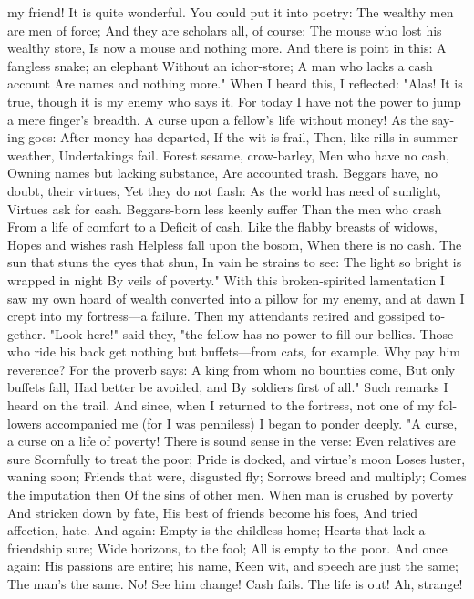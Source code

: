\documentclass{book}
\begin{document}
my friend! It is quite wonderful. You could put it
into poetry:
The wealthy men are men of force;
And they are scholars all, of course:
The mouse who lost his wealthy store,
Is now a mouse and nothing more.
And there is point in this:
A fangless snake; an elephant
Without an ichor-store;
A man who lacks a cash account
Are names and nothing more."
When I heard this, I reflected: "Alas! It is true,
though it is my enemy who says it. For today I have
not the power to jump a mere finger's breadth. A
curse upon a fellow's life without money! As the say-
ing goes:
After money has departed,
If the wit is frail,
Then, like rills in summer weather,
Undertakings fail.
Forest sesame, crow-barley,
Men who have no cash,
Owning names but lacking substance,
Are accounted trash.
Beggars have, no doubt, their virtues,
Yet they do not flash:
As the world has need of sunlight,
Virtues ask for cash.
Beggars-born less keenly suffer
Than the men who crash
From a life of comfort to a
Deficit of cash.
Like the flabby breasts of widows,
Hopes and wishes rash
Helpless fall upon the bosom,
When there is no cash.
The sun that stuns the eyes that shun,
In vain he strains to see:
The light so bright is wrapped in night
By veils of poverty."
With this broken-spirited lamentation I saw my
own hoard of wealth converted into a pillow for my
enemy, and at dawn I crept into my fortress---a
failure.
Then my attendants retired and gossiped to-
gether. "Look here!" said they, "the fellow has no
power to fill our bellies. Those who ride his back get
nothing but buffets---from cats, for example. Why
pay him reverence? For the proverb says:
A king from whom no bounties come,
But only buffets fall,
Had better be avoided, and
By soldiers first of all."
Such remarks I heard on the trail. And since,
when I returned to the fortress, not one of my fol-
lowers accompanied me (for I was penniless) I began
to ponder deeply.
"A curse, a curse on a life of poverty! There is
sound sense in the verse:
Even relatives are sure
Scornfully to treat the poor;
Pride is docked, and virtue's moon
Loses luster, waning soon;
Friends that were, disgusted fly;
Sorrows breed and multiply;
Comes the imputation then
Of the sins of other men.
When man is crushed by poverty
And stricken down by fate,
His best of friends become his foes,
And tried affection, hate.
And again:
Empty is the childless home;
Hearts that lack a friendship sure;
Wide horizons, to the fool;
All is empty to the poor.
And once again:
His passions are entire; his name,
Keen wit, and speech are just the same;
The man's the same. No! See him change!
Cash fails. The life is out! Ah, strange!
\end{document}
